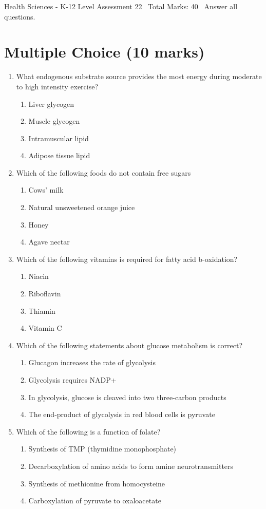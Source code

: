 \documentclass[12pt]{article}
\begin{document}
\begin{center}
Health Sciences - K-12 Level Assessment 22 \
Total Marks: 40 \
Answer all questions.
\end{center}

\section*{Multiple Choice (10 marks)}
\begin{enumerate}[label=\arabic*.]
\item What endogenous substrate source provides the most energy during moderate to high intensity exercise?
\begin{enumerate}[label=(\alph*)]
    \item Liver glycogen
    \item Muscle glycogen
    \item Intramuscular lipid
    \item Adipose tissue lipid
\end{enumerate}
\item Which of the following foods do not contain free sugars
\begin{enumerate}[label=(\alph*)]
    \item Cows' milk
    \item Natural unsweetened orange juice
    \item Honey
    \item Agave nectar
\end{enumerate}
\item Which of the following vitamins is required for fatty acid b-oxidation?
\begin{enumerate}[label=(\alph*)]
    \item Niacin
    \item Riboflavin
    \item Thiamin
    \item Vitamin C
\end{enumerate}
\item Which of the following statements about glucose metabolism is correct?
\begin{enumerate}[label=(\alph*)]
    \item Glucagon increases the rate of glycolysis
    \item Glycolysis requires NADP+
    \item In glycolysis, glucose is cleaved into two three-carbon products
    \item The end-product of glycolysis in red blood cells is pyruvate
\end{enumerate}
\item Which of the following is a function of folate?
\begin{enumerate}[label=(\alph*)]
    \item Synthesis of TMP (thymidine monophosphate)
    \item Decarboxylation of amino acids to form amine neurotransmitters
    \item Synthesis of methionine from homocysteine
    \item Carboxylation of pyruvate to oxaloacetate
\end{enumerate}
\end{enumerate}
\end{document}
